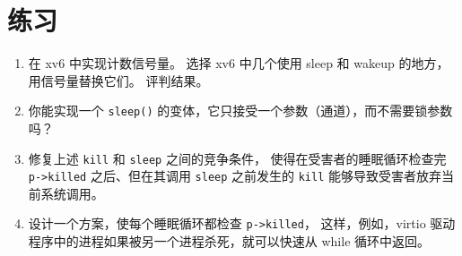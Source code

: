 \section{练习}

\begin{enumerate}

\item 在 xv6 中实现计数信号量。
选择 xv6 中几个使用 sleep 和 wakeup 的地方，用信号量替换它们。
评判结果。

\item 你能实现一个 {\tt sleep()} 的变体，它只接受一个参数（通道），而不需要锁参数吗？

\item 修复上述 \lstinline{kill} 和 \lstinline{sleep} 之间的竞争条件，
使得在受害者的睡眠循环检查完 \lstinline{p->killed} 之后、但在其调用 \lstinline{sleep} 之前发生的 \lstinline{kill} 能够导致受害者放弃当前系统调用。

\item 设计一个方案，使每个睡眠循环都检查 \lstinline{p->killed}，
这样，例如，virtio 驱动程序中的进程如果被另一个进程杀死，就可以快速从 while 循环中返回。

\end{enumerate}
